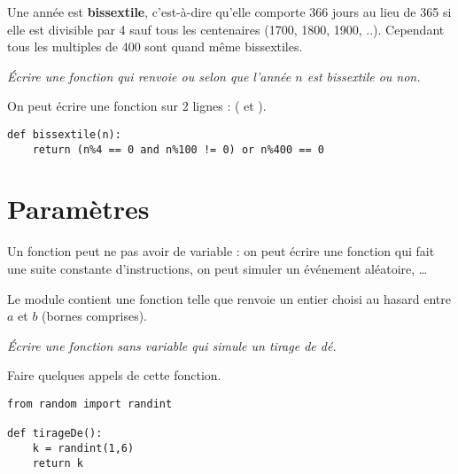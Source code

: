 Une année est {\bf bissextile}, c'est-à-dire qu'elle comporte 366 jours au lieu de 365 si elle est divisible par 4 sauf tous les centenaires (1700, 1800, 1900, ..). Cependant tous les multiples de 400 sont quand même bissextiles.
\begin{Exercise}[title={Années bissextiles}, label=exo:bissext1]
\it Écrire une fonction  qui renvoie  ou  selon que l'année $n$ est bissextile ou non.

On peut écrire une fonction sur 2 lignes : ( et ). 
\end{Exercise}
\begin{Answer}
\begin{lstlisting}
def bissextile(n):
    return (n%4 == 0 and n%100 != 0) or n%400 == 0
\end{lstlisting}
\end{Answer} 
\section{Paramètres} 
Un fonction peut ne pas avoir de variable : on peut écrire une fonction qui fait une suite constante d'instructions, on peut simuler un événement aléatoire, \dots

Le module  contient une fonction  telle que  renvoie un entier choisi au hasard entre $a$ et $b$ (bornes comprises).
\begin{Exercise}[title={Tirage de dé}]
\it 
Écrire une fonction sans variable  qui simule un tirage de dé.

Faire quelques appels de cette fonction.
\end{Exercise}
\begin{Answer}
\begin{lstlisting}
from random import randint

def tirageDe():
    k = randint(1,6)
    return k
\end{lstlisting}
\end{Answer} 

